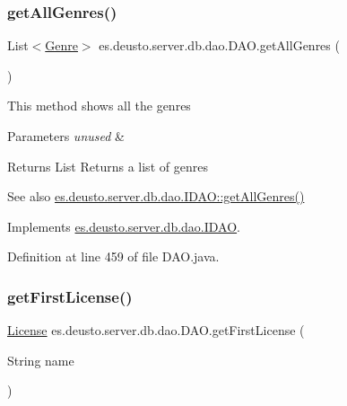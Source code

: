 \subsubsection{\texorpdfstring{get\+All\+Genres()}{getAllGenres()}}
{\footnotesize\ttfamily List$<$\hyperlink{classes_1_1deusto_1_1server_1_1db_1_1data_1_1_genre}{Genre}$>$ es.\+deusto.\+server.\+db.\+dao.\+D\+A\+O.\+get\+All\+Genres (\begin{DoxyParamCaption}{ }\end{DoxyParamCaption})}

This method shows all the genres 
\begin{DoxyParams}{Parameters}
{\em unused} & \\
\hline
\end{DoxyParams}
\begin{DoxyReturn}{Returns}
List Returns a list of genres 
\end{DoxyReturn}
\begin{DoxySeeAlso}{See also}
\hyperlink{interfacees_1_1deusto_1_1server_1_1db_1_1dao_1_1_i_d_a_o_a96ad8de066318847a7828b12befe94f7}{es.\+deusto.\+server.\+db.\+dao.\+I\+D\+A\+O\+::get\+All\+Genres()} 
\end{DoxySeeAlso}


Implements \hyperlink{interfacees_1_1deusto_1_1server_1_1db_1_1dao_1_1_i_d_a_o_a96ad8de066318847a7828b12befe94f7}{es.\+deusto.\+server.\+db.\+dao.\+I\+D\+AO}.



Definition at line 459 of file D\+A\+O.\+java.

\mbox{\label{classes_1_1deusto_1_1server_1_1db_1_1dao_1_1_d_a_o_a4a5a54059bac00ea6f3b6d21f2a31a02}} 
\subsubsection{\texorpdfstring{get\+First\+License()}{getFirstLicense()}}
{\footnotesize\ttfamily \hyperlink{classes_1_1deusto_1_1server_1_1db_1_1data_1_1_license}{License} es.\+deusto.\+server.\+db.\+dao.\+D\+A\+O.\+get\+First\+License (\begin{DoxyParamCaption}\item[{String}]{name }\end{DoxyParamCaption})}

